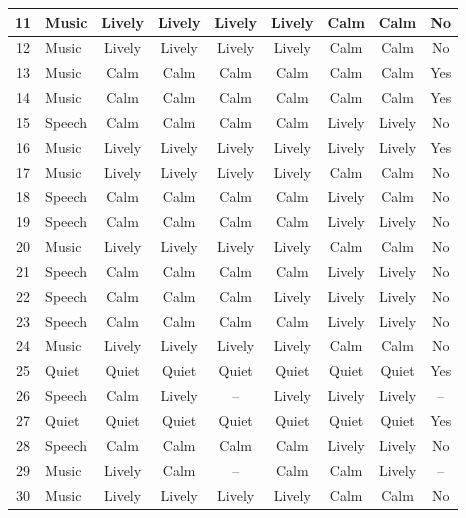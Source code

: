 {\begin{longtable}{|c|l|c|c|c|c|c|c|c|}
\hline
11 & Music & Lively & Lively & Lively & Lively & Calm & Calm & No \\
\hline
12 & Music & Lively & Lively & Lively & Lively & Calm & Calm & No \\
\hline
13 & Music & Calm & Calm & Calm & Calm & Calm & Calm & Yes \\
\hline
14 & Music & Calm & Calm & Calm & Calm & Calm & Calm & Yes \\
\hline
15 & Speech & Calm & Calm & Calm & Calm & Lively & Lively & No \\
\hline
16 & Music & Lively & Lively & Lively & Lively & Lively & Lively & Yes \\
\hline
17 & Music & Lively & Lively & Lively & Lively & Calm & Calm & No \\
\hline
18 & Speech & Calm & Calm & Calm & Calm & Lively & Calm & No \\
\hline
19 & Speech & Calm & Calm & Calm & Calm & Lively & Lively & No \\
\hline
20 & Music & Lively & Lively & Lively & Lively & Calm & Calm & No \\
\hline
21 & Speech & Calm & Calm & Calm & Calm & Lively & Lively & No \\
\hline
22 & Speech & Calm & Calm & Calm & Lively & Lively & Lively & No \\
\hline
23 & Speech & Calm & Calm & Calm & Calm & Lively & Lively & No \\
\hline
24 & Music & Lively & Lively & Lively & Lively & Calm & Calm & No \\
\hline
25 & Quiet & Quiet & Quiet & Quiet & Quiet & Quiet & Quiet & Yes \\
\hline
26 & Speech & Calm & Lively & -- & Lively & Lively & Lively & -- \\
\hline
27 & Quiet & Quiet & Quiet & Quiet & Quiet & Quiet & Quiet & Yes \\
\hline
28 & Speech & Calm & Calm & Calm & Calm & Lively & Lively & No \\
\hline
29 & Music & Lively & Calm & -- & Calm & Calm & Lively & -- \\
\hline
30 & Music & Lively & Lively & Lively & Lively & Calm & Calm & No \\
\hline
\end{longtable}
}
